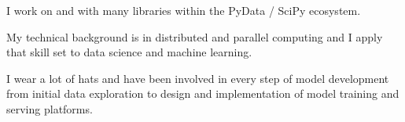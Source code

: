 I work on and with many libraries within the PyData / SciPy ecosystem.

My technical background is in distributed and parallel computing and I
apply that skill set to data science and machine learning.

I wear a lot of hats and have been involved in every step of model
development from initial data exploration to design and implementation
of model training and serving platforms.
